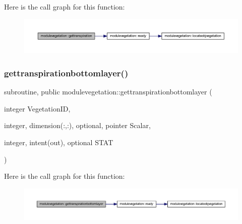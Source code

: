 Here is the call graph for this function\+:\nopagebreak
\begin{figure}[H]
\begin{center}
\leavevmode
\includegraphics[width=350pt]{namespacemodulevegetation_a016291d4e7aeb601c4e8ad878693cce7_cgraph}
\end{center}
\end{figure}
\mbox{\label{namespacemodulevegetation_ad98c388458251c42c13f5d7ee73e3b9f}} 
\subsubsection{\texorpdfstring{gettranspirationbottomlayer()}{gettranspirationbottomlayer()}}
{\footnotesize\ttfamily subroutine, public modulevegetation\+::gettranspirationbottomlayer (\begin{DoxyParamCaption}\item[{integer}]{Vegetation\+ID,  }\item[{integer, dimension(\+:,\+:), optional, pointer}]{Scalar,  }\item[{integer, intent(out), optional}]{S\+T\+AT }\end{DoxyParamCaption})}

Here is the call graph for this function\+:\nopagebreak
\begin{figure}[H]
\begin{center}
\leavevmode
\includegraphics[width=350pt]{namespacemodulevegetation_ad98c388458251c42c13f5d7ee73e3b9f_cgraph}
\end{center}
\end{figure}
\mbox{\label{namespacemodulevegetation_a57f3018a613928cdd40f99577993f439}} 
